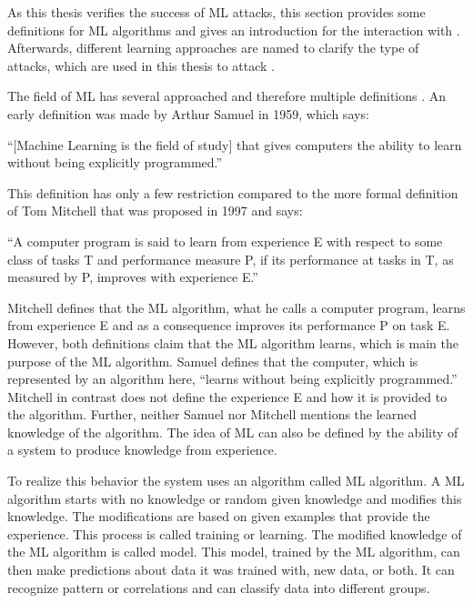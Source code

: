 As this thesis verifies the success of \acf{ML} attacks, this section provides some definitions for \ac{ML} algorithms and gives an introduction for the interaction with \pufs.
Afterwards, different learning approaches are named to clarify the type of attacks, which are used in this thesis to attack \pufs. %

The field of \ac{ML} has several approached and therefore multiple definitions \cite{Russell1995Modernapproach}.
An early definition was made by Arthur Samuel in 1959, which says:

``[Machine Learning is the field of study] that gives computers the ability to learn without being explicitly programmed.'' \cite{Samuel1959SomeCheckers}

This definition has only a few restriction compared to the more formal definition of Tom Mitchell that was proposed in 1997 and says:

``A computer program is said to learn from experience E with respect to some class of tasks T and performance measure P, if its performance at tasks in T, as measured by P, improves with experience E.'' \cite{Mitchell1997MachineLearning}

Mitchell defines that the \ac{ML} algorithm, what he calls a computer program, learns from experience E and as a consequence improves its performance P on task E. %
However, both definitions claim that the \ac{ML} algorithm learns, which is main the purpose of the \ac{ML} algorithm.
Samuel defines that the computer, which is represented by an algorithm here, ``learns without being explicitly programmed.''
Mitchell in contrast does not define the experience E and how it is provided to the algorithm. %
Further, neither Samuel nor Mitchell mentions the learned knowledge of the algorithm.
The idea of \acf{ML} can also be defined by the ability of a system to produce knowledge from experience.

To realize this behavior the system uses an algorithm called \ac{ML} algorithm.
A \ac{ML} algorithm starts with no knowledge or random given knowledge and modifies this knowledge.
The modifications are based on given examples that provide the experience. 
This process is called training or learning. %
The modified knowledge of the \ac{ML} algorithm is called model.
This model, trained by the \ac{ML} algorithm, can then make predictions about data it was trained with, new data, or both.
It can recognize pattern or correlations and can classify data into different groups.


